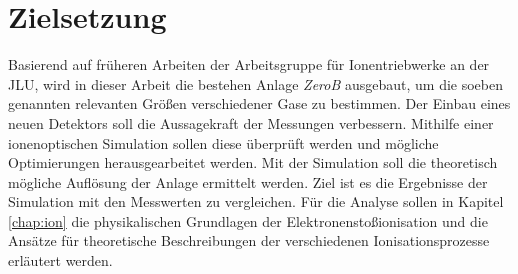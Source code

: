 \section{Zielsetzung}
Basierend auf früheren Arbeiten der Arbeitsgruppe für Ionentriebwerke an der JLU, wird in dieser Arbeit die bestehen Anlage \textit{ZeroB} ausgebaut, um die soeben genannten relevanten Größen verschiedener Gase zu bestimmen. Der Einbau eines neuen Detektors soll die Aussagekraft der Messungen verbessern. Mithilfe einer ionenoptischen Simulation sollen diese überprüft werden und mögliche Optimierungen herausgearbeitet werden. Mit der Simulation soll die theoretisch mögliche Auflösung der Anlage ermittelt werden. Ziel ist es die Ergebnisse der Simulation mit den Messwerten zu vergleichen. Für die Analyse sollen in Kapitel \ref{chap:ion} die physikalischen Grundlagen der Elektronenstoßionisation und die Ansätze für theoretische Beschreibungen der verschiedenen Ionisationsprozesse erläutert werden.